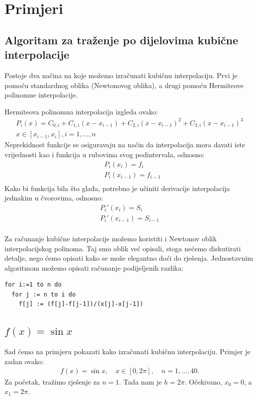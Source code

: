 \documentclass[12pt,a4paper]{report}
\begin{document}
	\section{Primjeri}
		\subsection{Algoritam za traženje po dijelovima kubične interpolacije}
		Postoje dva načina na koje možemo izračunati kubičnu interpolaciju. Prvi je pomoću standardnog oblika (Newtonovog oblika), a drugi pomoću Hermiteove polinomne interpolacije.
		
		Hermiteova polinomna interpolacija izgleda ovako:
		\begin{align*}
		P_i(x)=C_{0,i}+C_{1,i}(x-x_{i-1})+C_{2,i}(x-x_{i-1})^2+C_{3,i}(x-x_{i-1})^3 \\
		x\in[x_{i-1}, x_i], i=1,...,n
		\end{align*}
		Neprekidnost funkcije se osiguravaju na način da interpolacija mora davati iste vrijednosti kao i funkcija u rubovima svog podintervala, odnosno:
		\begin{align*}
			&P_i(x_i)=f_i\\
			&P_i(x_{i-1})=f_{i-1}\\
		\end{align*}
		Kako bi funkcija bila što glađa, potrebno je učiniti derivacije interpolacija jednakim u čvorovima, odnosno:
		\begin{align*}
		P_i'(x_i)=S_i\\
		P_i'(x_{i-1})=S_{i-1}\\
		\end{align*}
		
		
		Za računanje kubične interpolacije možemo koristiti i Newtonov oblik interpolacijskog polinoma. Taj smo oblik već opisali, stoga nećemo diskutirati detalje, nego ćemo opisati kako se može elegantno doći do rješenja. Jednostavnim algoritmom možemo opisati računanje podijeljenih razlika:
		\begin{lstlisting}
for i:=1 to n do
  for j := n to i do
    f[j] := (f[j]-f[j-1])/(x[j]-x[j-1])
		\end{lstlisting}


		\subsection{$f(x)=\sin x$}
		Sad ćemo na primjeru pokazati kako izračunati kubičnu interpolaciju. Primjer je zadan ovako:
		\begin{align*}
			f(x)=\sin x, \quad x\in [0, 2\pi], \quad n=1,...,40.
		\end{align*}
		Za početak, tražimo rješenje za $n=1$. Tada nam je $h=2\pi$. Očekivano, $x_0 = 0$, a $x_1 = 2\pi$.  
		
\end{document}
